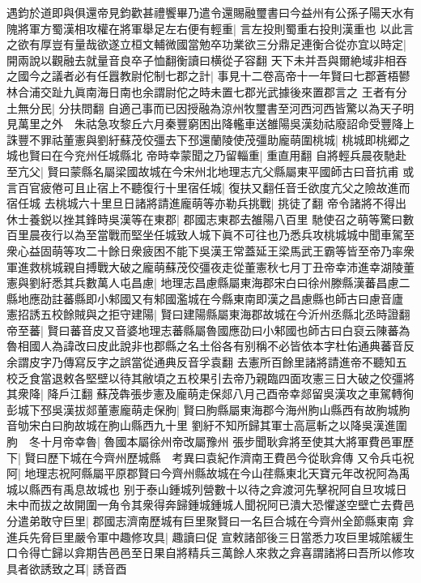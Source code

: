 遇鈞於道即與俱還帝見鈞歡甚禮饗畢乃遣令還賜融璽書曰今益州有公孫子陽天水有隗將軍方蜀漢相攻權在將軍舉足左右便有輕重|{
	言左投則蜀重右投則漢重也}
以此言之欲有厚豈有量哉欲遂立桓文輔微國當勉卒功業欲三分鼎足連衡合從亦宜以時定|{
	開兩說以觀融去就量音良卒子恤翻衡讀曰横從子容翻}
天下未并吾與爾絶域非相吞之國今之議者必有任囂教尉佗制七郡之計|{
	事見十二卷高帝十一年賢曰七郡蒼梧鬰林合浦交趾九眞南海日南也余謂尉佗之時未置七郡光武據後來置郡言之}
王者有分土無分民|{
	分扶問翻}
自適己事而已因授融為涼州牧璽書至河西河西皆驚以為天子明見萬里之外　朱祜急攻黎丘六月秦豐窮困出降轞車送雒陽吳漢劾祜廢詔命受豐降上誅豐不罪祜董憲與劉紆蘇茂佼彊去下邳還蘭陵使茂彊助龐萌圍桃城|{
	桃城即桃郷之城也賢曰在今兖州任城縣北}
帝時幸蒙聞之乃留輜重|{
	重直用翻}
自將輕兵晨夜馳赴至亢父|{
	賢曰蒙縣名屬梁國故城在今宋州北地理志亢父縣屬東平國師古曰音抗甫}
或言百官疲倦可且止宿上不聽復行十里宿任城|{
	復扶又翻任音壬欲度亢父之險故進而宿任城}
去桃城六十里旦日諸將請進龐萌等亦勒兵挑戰|{
	挑徒了翻}
帝令諸將不得出休士養鋭以挫其鋒時吳漢等在東郡|{
	郡國志東郡去雒陽八百里}
馳使召之萌等驚曰數百里晨夜行以為至當戰而堅坐任城致人城下眞不可往也乃悉兵攻桃城城中聞車駕至衆心益固萌等攻二十餘日衆疲困不能下吳漢王常蓋延王梁馬武王霸等皆至帝乃率衆軍進救桃城親自搏戰大破之龐萌蘇茂佼彊夜走從董憲秋七月丁丑帝幸沛進幸湖陵董憲與劉紆悉其兵數萬人屯昌慮|{
	地理志昌慮縣屬東海郡宋白曰徐州滕縣漢蕃昌慮二縣地應劭註蕃縣即小邾國又有邾國濫城在今縣東南即漢之昌慮縣也師古曰慮音廬}
憲招誘五校餘賊與之拒守建陽|{
	賢曰建陽縣屬東海郡故城在今沂州丞縣北丞時證翻}
帝至蕃|{
	賢曰蕃音皮又音婆地理志蕃縣屬魯國應劭曰小邾國也師古曰白裒云陳蕃為魯相國人為諱改曰皮此說非也郡縣之名土俗各有别稱不必皆依本字杜佑通典蕃音反余謂皮字乃傳寫反字之誤當從通典反音孚袁翻}
去憲所百餘里諸將請進帝不聽知五校乏食當退敕各堅壁以待其敝頃之五校果引去帝乃親臨四面攻憲三日大破之佼彊將其衆降|{
	降戶江翻}
蘇茂犇張步憲及龐萌走保郯八月己酉帝幸郯留吳漢攻之車駕轉徇彭城下邳吳漢拔郯董憲龐萌走保朐|{
	賢曰朐縣屬東海郡今海州朐山縣西有故朐城朐音劬宋白曰朐故城在朐山縣西九十里}
劉紆不知所歸其軍士高扈斬之以降吳漢進圍朐　冬十月帝幸魯|{
	魯國本屬徐州帝改屬豫州}
張步聞耿弇將至使其大將軍費邑軍歷下|{
	賢曰歷下城在今齊州歷城縣　考異曰袁紀作濟南王費邑今從耿弇傳}
又令兵屯祝阿|{
	地理志祝阿縣屬平原郡賢曰今齊州縣故城在今山荏縣東北天寶元年改祝阿為禹城以縣西有禹息故城也}
别于泰山鍾城列營數十以待之弇渡河先擊祝阿自旦攻城日未中而拔之故開圍一角令其衆得奔歸鍾城鍾城人聞祝阿已潰大恐懼遂空壁亡去費邑分遣弟敢守巨里|{
	郡國志濟南歷城有巨里聚賢曰一名巨合城在今齊州全節縣東南}
弇進兵先脅巨里嚴令軍中趣修攻具|{
	趣讀曰促}
宣敕諸部後三日當悉力攻巨里城隂緩生口令得亡歸以弇期告邑邑至日果自將精兵三萬餘人來救之弇喜謂諸將曰吾所以修攻具者欲誘致之耳|{
	誘音酉}
